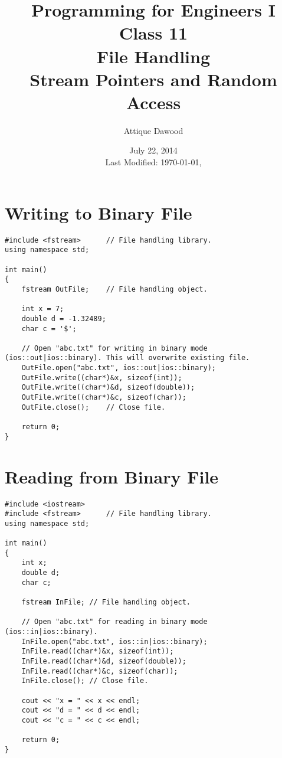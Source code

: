 \documentclass[12pt,a4paper]{article}
\title{Programming for Engineers I\\Class 11\\File Handling\\Stream Pointers and Random Access}
\author{Attique Dawood}
\date{July 22, 2014\\[0.2cm] Last Modified: \today, \currenttime}
\begin{document}
\maketitle
\section{Writing to Binary File}
\begin{lstlisting}[caption={Writing to binary file}]
#include <fstream>		// File handling library.
using namespace std;

int main()
{
	fstream OutFile;	// File handling object.

	int x = 7;
	double d = -1.32489;
	char c = '$';

	// Open "abc.txt" for writing in binary mode (ios::out|ios::binary). This will overwrite existing file.
	OutFile.open("abc.txt", ios::out|ios::binary);
	OutFile.write((char*)&x, sizeof(int));
	OutFile.write((char*)&d, sizeof(double));
	OutFile.write((char*)&c, sizeof(char));
	OutFile.close();	// Close file.

	return 0;
}
\end{lstlisting}
\section{Reading from Binary File}
\begin{lstlisting}[caption={Reading from Binary file}]
#include <iostream>
#include <fstream>		// File handling library.
using namespace std;

int main()
{
	int x;
	double d;
	char c;

	fstream InFile;	// File handling object.

	// Open "abc.txt" for reading in binary mode (ios::in|ios::binary).
	InFile.open("abc.txt", ios::in|ios::binary);
	InFile.read((char*)&x, sizeof(int));
	InFile.read((char*)&d, sizeof(double));
	InFile.read((char*)&c, sizeof(char));
	InFile.close();	// Close file.

	cout << "x = " << x << endl;
	cout << "d = " << d << endl;
	cout << "c = " << c << endl;

	return 0;
}
\end{lstlisting}
\end{document}
